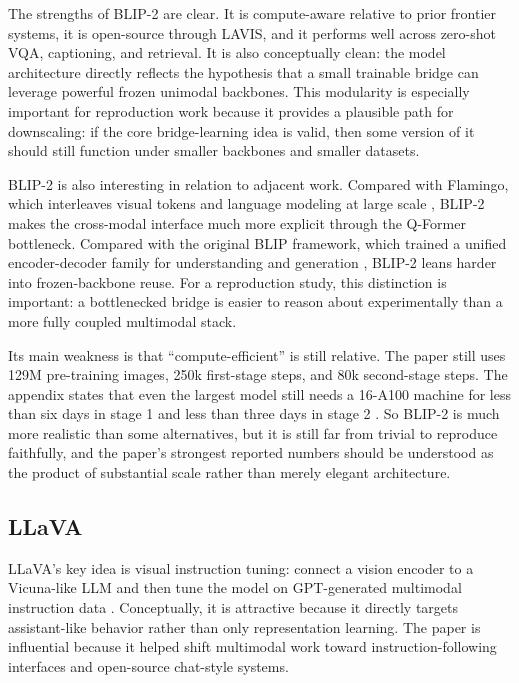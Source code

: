 \documentclass[11pt]{article}
\begin{document}
The strengths of BLIP-2 are clear. It is compute-aware relative to prior frontier systems, it is open-source through LAVIS, and it performs well across zero-shot VQA, captioning, and retrieval. It is also conceptually clean: the model architecture directly reflects the hypothesis that a small trainable bridge can leverage powerful frozen unimodal backbones. This modularity is especially important for reproduction work because it provides a plausible path for downscaling: if the core bridge-learning idea is valid, then some version of it should still function under smaller backbones and smaller datasets.

BLIP-2 is also interesting in relation to adjacent work. Compared with Flamingo, which interleaves visual tokens and language modeling at large scale \citep{alayrac2022flamingo}, BLIP-2 makes the cross-modal interface much more explicit through the Q-Former bottleneck. Compared with the original BLIP framework, which trained a unified encoder-decoder family for understanding and generation \citep{li2022blip}, BLIP-2 leans harder into frozen-backbone reuse. For a reproduction study, this distinction is important: a bottlenecked bridge is easier to reason about experimentally than a more fully coupled multimodal stack.

Its main weakness is that ``compute-efficient'' is still relative. The paper still uses 129M pre-training images, 250k first-stage steps, and 80k second-stage steps. The appendix states that even the largest model still needs a 16-A100 machine for less than six days in stage 1 and less than three days in stage 2 \citep{li2023blip2}. So BLIP-2 is much more realistic than some alternatives, but it is still far from trivial to reproduce faithfully, and the paper's strongest reported numbers should be understood as the product of substantial scale rather than merely elegant architecture.

\subsection{LLaVA}
LLaVA's key idea is visual instruction tuning: connect a vision encoder to a Vicuna-like LLM and then tune the model on GPT-generated multimodal instruction data \citep{liu2023visual}. Conceptually, it is attractive because it directly targets assistant-like behavior rather than only representation learning. The paper is influential because it helped shift multimodal work toward instruction-following interfaces and open-source chat-style systems.
\end{document}
